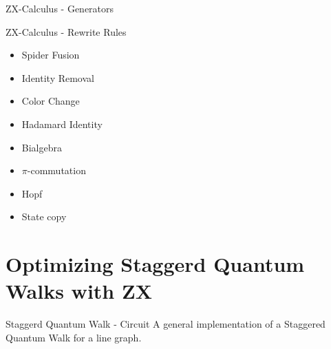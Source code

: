 \documentclass{beamer}
\begin{document}
\begin{frame}{ZX-Calculus - Generators}
\end{frame}
\begin{frame}{ZX-Calculus - Rewrite Rules}



	\begin{multicols}{2}
		\begin{itemize}
			\item Spider Fusion
			\item Identity Removal
			\item Color Change
			\item Hadamard Identity
			\item Bialgebra
			\item $\pi$-commutation
			\item Hopf
			\item State copy


		\end{itemize}
	\end{multicols}



\end{frame}
\section{Optimizing Staggerd Quantum Walks with ZX}

\begin{frame}{Staggerd Quantum Walk - Circuit}
	A general implementation of a Staggered Quantum Walk for a line graph.


\end{frame}
\end{document}
